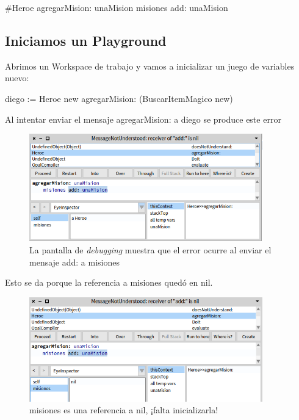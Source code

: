 \documentclass[a4paper,12pt]{book}
\begin{document}
\begin{code}
#Heroe
agregarMision: unaMision
  misiones add: unaMision
\end{code}

\subsection{Iniciamos un Playground}
Abrimos un Workspace de trabajo y vamos a inicializar un juego de variables nuevo:

\begin{code}
diego := Heroe new
  agregarMision: (BuscarItemMagico new)
\end{code}

Al intentar enviar el mensaje agregarMision: a diego se produce este error

\begin{figure}[h!]
    \centering	
    \includegraphics[width=0.9\textwidth]{images/11_error_agregarMision.png}
    \caption{La pantalla de \textit{debugging} muestra que el error ocurre al enviar el mensaje add: a misiones}
\end{figure}
\FloatBarrier

Esto se da porque la referencia a misiones quedó en nil. 

\begin{figure}[h!]
    \centering	
    \includegraphics[width=0.9\textwidth]{images/12_error_debugging_2.png}
    \caption{misiones es una referencia a nil, ¡falta inicializarla!}
\end{figure}
\FloatBarrier
\end{document}
